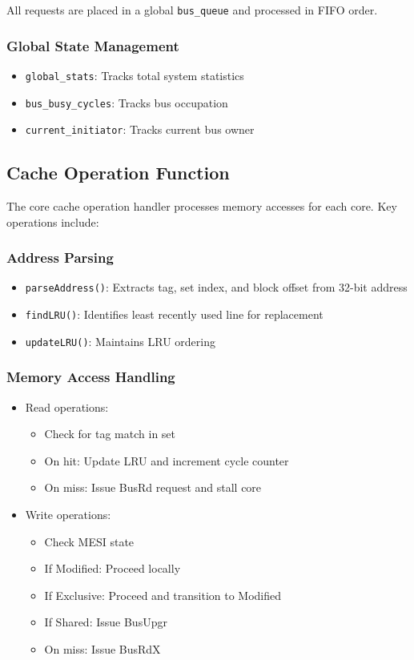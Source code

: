 \documentclass{article}
\begin{document}
All requests are placed in a global \texttt{bus\_queue} and processed in FIFO order.

\subsubsection{Global State Management}
\begin{itemize}
    \item \texttt{global\_stats}: Tracks total system statistics
    \item \texttt{bus\_busy\_cycles}: Tracks bus occupation
    \item \texttt{current\_initiator}: Tracks current bus owner
\end{itemize}

\subsection{Cache Operation Function}
The core cache operation handler processes memory accesses for each core. Key operations include:

\subsubsection{Address Parsing}
\begin{itemize}
    \item \texttt{parseAddress()}: Extracts tag, set index, and block offset from 32-bit address
    \item \texttt{findLRU()}: Identifies least recently used line for replacement
    \item \texttt{updateLRU()}: Maintains LRU ordering
\end{itemize}

\subsubsection{Memory Access Handling}
\begin{itemize}
    \item Read operations:
    \begin{itemize}
        \item Check for tag match in set
        \item On hit: Update LRU and increment cycle counter
        \item On miss: Issue BusRd request and stall core
    \end{itemize}
    
    \item Write operations:
    \begin{itemize}
        \item Check MESI state
        \item If Modified: Proceed locally
        \item If Exclusive: Proceed and transition to Modified
        \item If Shared: Issue BusUpgr
        \item On miss: Issue BusRdX
    \end{itemize}
\end{itemize}
\end{document}
